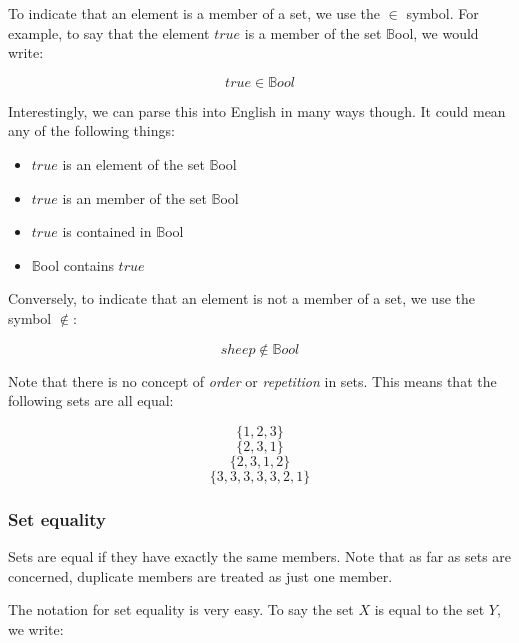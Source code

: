To indicate that an element is a member of a set, we use the $\in$ symbol. For
example, to say that the element $true$ is a member of the set $\mathbb{B}$ool,
we would write:

\begin{dmath*}
	true \in \mathbb{B}ool
\end{dmath*}

Interestingly, we can parse this into English in many ways though. It could mean
any of the following things:

\begin{itemize}
	\item $true$ is an element of the set $\mathbb{B}$ool
	\item $true$ is an member of the set $\mathbb{B}$ool
	\item $true$ is contained in $\mathbb{B}$ool
	\item $\mathbb{B}$ool contains $true$
\end{itemize}

Conversely, to indicate that an element is not a member of a set, we use the
symbol $\notin$:

\begin{dmath*}
	sheep \not\in \mathbb{B}ool
\end{dmath*}

Note that there is no concept of {\it order} or {\it repetition} in sets. This
means that the following sets are all equal:

\begin{dmath*}
	\{1,2,3\}
\end{dmath*}
\begin{dmath*}
	\{2,3,1\}
\end{dmath*}
\begin{dmath*}
	\{2,3,1,2\}
\end{dmath*}
\begin{dmath*}
	\{3,3,3,3,3,2,1\}
\end{dmath*}

\subsubsection{Set equality}

Sets are equal if they have exactly the same members. Note that as far as sets
are concerned, duplicate members are treated as just one member.

The notation for set equality is very easy. To say the set $X$ is equal to the
set $Y$, we write:

